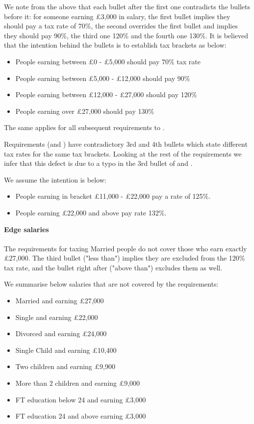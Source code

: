 We note from the above that each bullet after the first one contradicts the bullets before it: for someone earning £3,000 in salary, the first bullet implies they should pay a tax rate of 70\%, the second overrides the first bullet and implies they should pay 90\%, the third one 120\% and the fourth one 130\%. It is believed that the intention behind the bullets is to establish tax brackets as below: 
\begin{itemize}[noitemsep]
	\item People earning between £0 - £5,000 should pay 70\% tax rate 
	\item People earning between £5,000 - £12,000 should pay 90\%
	\item People earning between £12,000 - £27,000 should pay 120\%
	\item People earning over £27,000 should pay 130\%
\end{itemize}
The same applies for all subsequent requirements \REightSix \space to \REightTwelve. 

Requirements (\REightSix \space and \REightSeven) have contradictory 3rd and 4th bullets which state different tax rates for the same tax brackets. Looking at the rest of the requirements we infer that this defect is due to a typo in the 3rd bullet of \REightSix \space and \REightSeven. 

We assume the intention is below: 
\begin{itemize}[noitemsep]
	\item People earning in bracket £11,000 - £22,000 pay a rate of 125\%.
	\item People earning £22,000 and above pay rate 132\%.
\end{itemize}

\textbf{Edge salaries\\}
\\
The requirements for taxing Married people do not cover those who earn exactly £27,000. The third bullet ("less than") implies they are excluded from the 120\% tax rate, and the bullet right after ("above than") excludes them as well. 
\par
We summarise below salaries that are not covered by the requirements:  
\begin{itemize}%
	\item Married and earning £27,000
	\item Single and earning £22,000
	\item Divorced and earning £24,000
	\item Single Child and earning £10,400
	\item Two children and earning £9,900
	\item More than 2 children and earning £9,000
	\item FT education below 24 and earning £3,000
	\item FT education 24 and above earning £3,000
\end{itemize}


